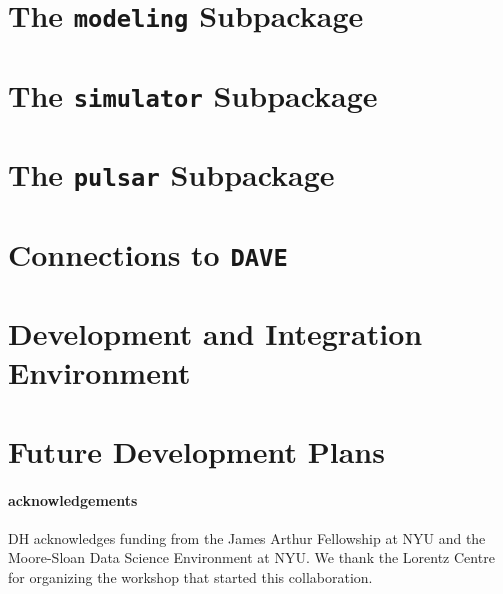 \documentclass[12pt]{emulateapj}
\begin{document}
\section{The \texttt{modeling} Subpackage}
\label{sec:modeling}

\section{The \texttt{simulator} Subpackage}
\label{sec:simulator}

\section{The \texttt{pulsar} Subpackage}
\label{sec:pulsar}

\section{Connections to \texttt{DAVE}}
\label{sec:dave}

\section{Development and Integration Environment}
\label{sec:development}

\section{Future Development Plans}
\label{sec:future}

\paragraph{acknowledgements}
DH acknowledges funding from the James Arthur Fellowship at NYU and the Moore-Sloan Data Science Environment at NYU. 
We thank the Lorentz Centre for organizing the workshop that started this collaboration.
\clearpage



\end{document}
